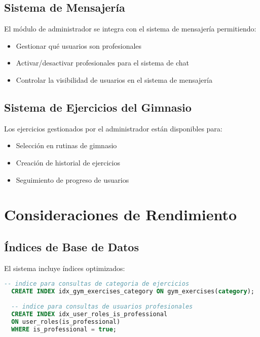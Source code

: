 \documentclass[12pt,a4paper]{article}
\begin{document}
\subsection{Sistema de Mensajería}

El módulo de administrador se integra con el sistema de mensajería permitiendo:

\begin{itemize}
  \item Gestionar qué usuarios son profesionales
  \item Activar/desactivar profesionales para el sistema de chat
  \item Controlar la visibilidad de usuarios en el sistema de mensajería
\end{itemize}

\subsection{Sistema de Ejercicios del Gimnasio}

Los ejercicios gestionados por el administrador están disponibles para:

\begin{itemize}
  \item Selección en rutinas de gimnasio
  \item Creación de historial de ejercicios
  \item Seguimiento de progreso de usuarios
\end{itemize}

\section{Consideraciones de Rendimiento}

\subsection{Índices de Base de Datos}

El sistema incluye índices optimizados:

\begin{lstlisting}[language=SQL, caption=Índices para optimización]
  -- indice para consultas de categoria de ejercicios
  CREATE INDEX idx_gym_exercises_category ON gym_exercises(category);
  
  -- indice para consultas de usuarios profesionales
  CREATE INDEX idx_user_roles_is_professional 
  ON user_roles(is_professional) 
  WHERE is_professional = true;
\end{lstlisting}
\end{document}
